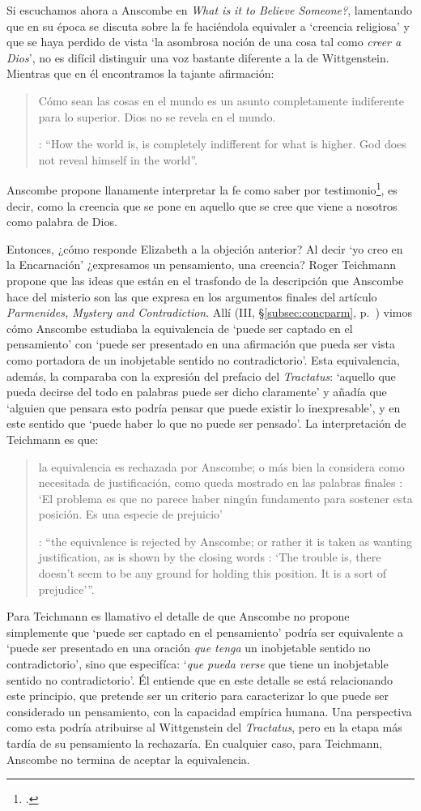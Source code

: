 Si escuchamos ahora a Anscombe en \emph{What is it to Believe Someone?}, lamentando que en su época se discuta sobre la fe haciéndola equivaler a `creencia religiosa' y que se haya perdido de vista \enquote*{la asombrosa noción de una cosa tal como \emph{creer a Dios}}, no es difícil distinguir una voz bastante diferente a la de Wittgenstein. Mientras que en él encontramos la tajante afirmación: \blockquote[{\Cite[\S6.432]{wittgenstein1922tractatus}}: \enquote{How the world is, is completely indifferent for what is higher. God does not reveal himself in the world}.]{Cómo sean las cosas en el mundo es un asunto completamente indiferente para lo superior. Dios no se revela en el mundo.}; Anscombe propone llanamente interpretar la fe como saber por testimonio\footnote{\cite[Cf.][87-88]{conesa1994cc}.}, es decir, como la creencia que se pone en aquello que se cree que viene a nosotros como palabra de Dios.

Entonces, ¿cómo responde Elizabeth a la objeción anterior? Al decir \enquote*{yo creo en la Encarnación} ¿expresamos un pensamiento, una creencia? Roger Teichmann propone que las ideas que están en el trasfondo de la descripción que Anscombe hace del misterio son las que expresa en los argumentos finales del artículo \emph{Parmenides, Mystery and Contradiction}. Allí (III, \S\ref{subsec:concparm}, p.~\pageref{subsec:concparm}) vimos cómo Anscombe estudiaba la equivalencia de `puede ser captado en el pensamiento' con `puede ser presentado en una afirmación que pueda ser vista como portadora de un inobjetable sentido no contradictorio'. Esta equivalencia, además, la comparaba con la expresión del prefacio del \emph{Tractatus}: `aquello que pueda decirse del todo en palabras puede ser dicho claramente' y añadía que \enquote*{alguien que pensara esto podría pensar que puede existir lo inexpresable}, y en este sentido que \enquote*{puede haber lo que no puede ser pensado}. La interpretación de Teichmann es que: \blockquote[{\Cite[212]{teichmann2008ans}}: \enquote{the equivalence is rejected by Anscombe; or rather it is taken as wanting justification, as is shown by the closing words \textelp{}: `The trouble is, there doesn't seem to be any ground for holding this position. It is a sort of prejudice'}.]{la equivalencia es rechazada por Anscombe; o más bien la considera como necesitada de justificación, como queda mostrado en las palabras finales \textelp{}: `El problema es que no parece haber ningún fundamento para sostener esta posición. Es una especie de prejuicio'}. Para Teichmann es llamativo el detalle de que Anscombe no propone simplemente que \enquote*{puede ser captado en el pensamiento} podría ser equivalente a \enquote*{puede ser presentado en una oración \emph{que tenga} un inobjetable sentido no contradictorio}, sino que especifíca: \enquote*{\emph{que pueda verse} que tiene un inobjetable sentido no contradictorio}. Él entiende que en este detalle se está relacionando este principio, que pretende ser un criterio para caracterizar lo que puede ser considerado un pensamiento, con la capacidad empírica humana. Una perspectiva como esta podría atribuirse al Wittgenstein del \emph{Tractatus}, pero en la etapa más tardía de su pensamiento la rechazaría. En cualquier caso, para Teichmann, Anscombe no termina de aceptar la equivalencia.

